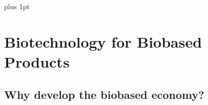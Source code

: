 \documentclass[]{beamer}
\begin{document}
\begin{CJK}{UTF8}{gbsn}

\parskip=1cm plus 1pt


\section{Biotechnology for Biobased Products}

\subsection{ Why develop the biobased economy?}

\setcounter{questions}{0}
\setcounter{answers}{0}
\setcounter{questions}{0}
\setcounter{answers}{0}



\end{CJK}
\end{document}
